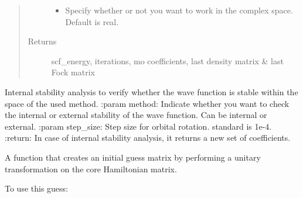 \documentclass[letterpaper,10pt,english]{sphinxmanual}
\begin{document}
\begin{fulllineitems}
\begin{fulllineitems}
\begin{quote}
\begin{description}
\begin{itemize}
\item {} 
 \textendash{} Specify whether or not you want to work in the complex space. Default is real.

\end{itemize}

\item[{Returns}] \leavevmode
scf\_energy, iterations, mo coefficients, last density matrix \& last Fock matrix

\end{description}\end{quote}

\end{fulllineitems}


\begin{fulllineitems}
\label{\detokenize{GHF:ghf.GHF.GHF.stability_analysis}}
Internal stability analysis to verify whether the wave function is stable within the space of the used method.
:param method: Indicate whether you want to check the internal or external stability of the wave function. Can
be internal or external.
:param step\_size: Step size for orbital rotation. standard is 1e-4.
:return: In case of internal stability analysis, it returns a new set of coefficients.

\end{fulllineitems}


\begin{fulllineitems}
\label{\detokenize{GHF:ghf.GHF.GHF.unitary_rotation_guess}}
A function that creates an initial guess matrix by performing a unitary transformation on the core Hamiltonian
matrix.

To use this guess:


\end{fulllineitems}
\end{fulllineitems}
\end{document}
